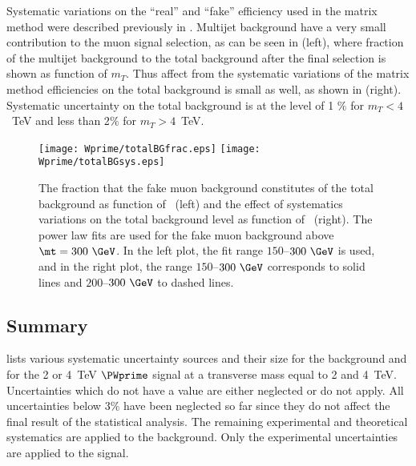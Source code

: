 Systematic variations on the ``real'' and ``fake'' efficiency used in the matrix method were
described previously in .
Multijet background have a very small contribution to the muon signal selection, as can be seen in 
 (left), where fraction of the multijet background to the total background
after the final selection is shown as function of $m_T$. Thus affect from the systematic
variations of the matrix method efficiencies on the total background is small as well, as shown in
 (right). 
Systematic uncertainty on the total background is at the level of 1 $\%$ for $m_T<4$~TeV and less than 2$\%$ for $m_T>4$~TeV.

\begin{figure}[!htb]
  \centering
  \texttt{[image: Wprime/totalBGfrac.eps]}
  \texttt{[image: Wprime/totalBGsys.eps]}
  \caption{The fraction that the fake muon background constitutes of the total background
as function of \mt\ (left) and the effect of systematics variations on the total background
level as function of \mt\ (right). The power law fits are used for the fake muon background above
$\mt=300~\GeV$. In the left plot, the fit range $150$--$300~\GeV$ is used, and in the right plot, the
range $150$--$300~\GeV$ corresponds to solid lines and $200$--$300~\GeV$ to dashed lines.}
  \label{fig:muMMfinal}
\end{figure}

\subsection{Summary}
 lists various systematic uncertainty sources
and their size for the background and for the 2 or 4~TeV $\PWprime$ signal at a transverse mass equal to 2 and 4~TeV.
Uncertainties which do not have a value are either neglected or do not apply. 
All uncertainties below $3$\% have been neglected so far
since they do not affect the final result of the statistical analysis. 
The remaining experimental and theoretical systematics are applied to the background.
Only the experimental uncertainties are applied to the signal. 

